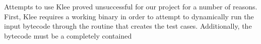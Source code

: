 Attempts to use Klee proved unsuccessful for our project for a number of reasons.
First, Klee requires a working binary in order to attempt to dynamically run the input bytecode
through the routine that creates the test cases.
Additionally, the bytecode must be a completely contained 
